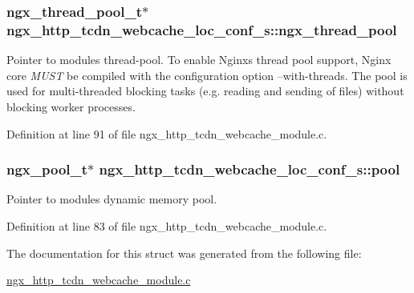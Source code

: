 \subsubsection[{\texorpdfstring{ngx\+\_\+thread\+\_\+pool}{ngx_thread_pool}}]{\setlength{\rightskip}{0pt plus 5cm}ngx\+\_\+thread\+\_\+pool\+\_\+t$\ast$ ngx\+\_\+http\+\_\+tcdn\+\_\+webcache\+\_\+loc\+\_\+conf\+\_\+s\+::ngx\+\_\+thread\+\_\+pool}\hypertarget{structngx__http__tcdn__webcache__loc__conf__s_a45fb29b1a518f86433416c1798d6bef9}{}\label{structngx__http__tcdn__webcache__loc__conf__s_a45fb29b1a518f86433416c1798d6bef9}
Pointer to module\textquotesingle{}s thread-\/pool. To enable Nginx\textquotesingle{}s thread pool support, Nginx core {\itshape M\+U\+ST} be compiled with the configuration option \textquotesingle{}--with-\/threads\textquotesingle{}. The pool is used for multi-\/threaded blocking tasks (e.\+g. reading and sending of files) without blocking worker processes. 

Definition at line 91 of file ngx\+\_\+http\+\_\+tcdn\+\_\+webcache\+\_\+module.\+c.

\subsubsection[{\texorpdfstring{pool}{pool}}]{\setlength{\rightskip}{0pt plus 5cm}ngx\+\_\+pool\+\_\+t$\ast$ ngx\+\_\+http\+\_\+tcdn\+\_\+webcache\+\_\+loc\+\_\+conf\+\_\+s\+::pool}\hypertarget{structngx__http__tcdn__webcache__loc__conf__s_a94064da09d7e03102f9906f20b139e6e}{}\label{structngx__http__tcdn__webcache__loc__conf__s_a94064da09d7e03102f9906f20b139e6e}
Pointer to module\textquotesingle{}s dynamic memory pool. 

Definition at line 83 of file ngx\+\_\+http\+\_\+tcdn\+\_\+webcache\+\_\+module.\+c.



The documentation for this struct was generated from the following file\+:\begin{DoxyCompactItemize}
\item 
\hyperlink{ngx__http__tcdn__webcache__module_8c}{ngx\+\_\+http\+\_\+tcdn\+\_\+webcache\+\_\+module.\+c}\end{DoxyCompactItemize}
